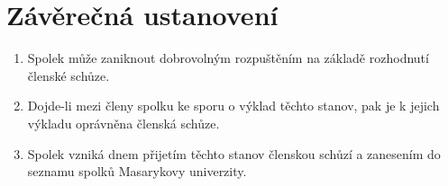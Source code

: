 \documentclass[11pt]{article}
\begin{document}
\section{Závěrečná ustanovení}
\begin{enumerate}
    \item Spolek může zaniknout dobrovolným rozpuštěním na základě rozhodnutí
    členské schůze.
    \item Dojde-li mezi členy spolku ke sporu o výklad těchto stanov, pak je 
    k jejich výkladu oprávněna členská schůze.
    \item Spolek vzniká dnem přijetím těchto stanov členskou schůzí a zanesením 
    do seznamu spolků Masarykovy univerzity.
\end{enumerate}
\end{document}

